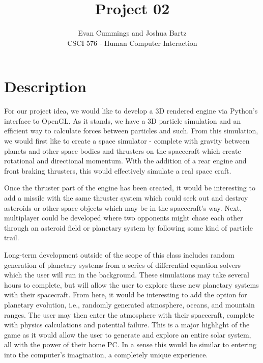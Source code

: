 
\DeclareMathOperator*{\argmax}{arg\,max}


\small

\title{Project 02}
\author{Evan Cummings and Joshua Bartz\\
CSCI 576 - Human Computer Interaction}

\maketitle

\section*{Description}

For our project idea, we would like to develop a 3D rendered engine via Python's interface to OpenGL.  As it stands, we have a 3D particle simulation and an efficient way to calculate forces between particles and such.  From this simulation, we would first like to create a space simulator - complete with gravity between planets and other space bodies and thrusters on the spacecraft which create rotational and directional momentum.  With the addition of a rear engine and front braking thrusters, this would effectively simulate a real space craft.  

Once the thruster part of the engine has been created, it would be interesting to add a missile with the same thruster system which could seek out and destroy asteroids or other space objects which may be in the spacecraft's way.  Next, multiplayer could be developed where two opponents might chase each other through an asteroid field or planetary system by following some kind of particle trail.  

Long-term development outside of the scope of this class includes random generation of planetary systems from a series of differential equation solvers which the user will run in the background.  These simulations may take several hours to complete, but will allow the user to explore these new planetary systems with their spacecraft.  From here, it would be interesting to add the option for planetary evolution, i.e., randomly generated atmosphere, oceans, and mountain ranges.  The user may then enter the atmosphere with their spacecraft, complete with physics calculations and potential failure.  This is a major highlight of the game as it would allow the user to generate and explore an entire solar system, all with the power of their home PC.  In a sense this would be similar to entering into the computer's imagination, a completely unique experience.

